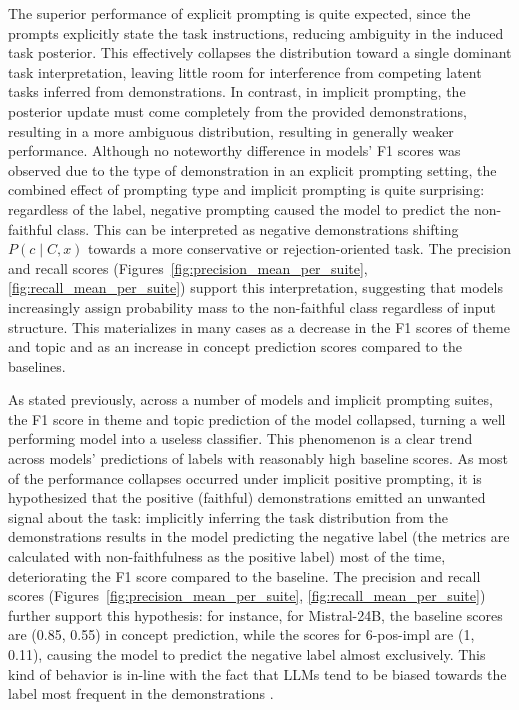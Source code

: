\documentclass[english, 12pt, a4paper, sci, utf8, a-2b, online]{latex/definitions/aaltothesis}
\begin{document}
The superior performance of explicit prompting is quite expected, since the prompts explicitly state the task instructions, reducing ambiguity in the induced task posterior. This effectively collapses the distribution toward a single dominant task interpretation, leaving little room for interference from competing latent tasks inferred from demonstrations. In contrast, in implicit prompting, the posterior update must come completely from the provided demonstrations, resulting in a more ambiguous distribution, resulting in generally weaker performance. Although no noteworthy difference in models' F1 scores was observed due to the type of demonstration in an explicit prompting setting, the combined effect of prompting type and implicit prompting is quite surprising: regardless of the label, negative prompting caused the model to predict the non-faithful class. This can be interpreted as negative demonstrations shifting $P(c \mid C, x)$ towards a more conservative or rejection-oriented task. The precision and recall scores (Figures~\ref{fig:precision_mean_per_suite}, \ref{fig:recall_mean_per_suite}) support this interpretation, suggesting that models increasingly assign probability mass to the non-faithful class regardless of input structure. This materializes in many cases as a decrease in the F1 scores of theme and topic and as an increase in concept prediction scores compared to the baselines.

As stated previously, across a number of models and implicit prompting suites, the F1 score in theme and topic prediction of the model collapsed, turning a well performing model into a useless classifier. This phenomenon is a clear trend across models' predictions of labels with reasonably high baseline scores. As most of the performance collapses occurred under implicit positive prompting, it is hypothesized that the positive (faithful) demonstrations emitted an unwanted signal about the task: implicitly inferring the task distribution from the demonstrations results in the model predicting the negative label (the metrics are calculated with non-faithfulness as the positive label) most of the time, deteriorating the F1 score compared to the baseline. The precision and recall scores (Figures~\ref{fig:precision_mean_per_suite}, \ref{fig:recall_mean_per_suite}) further support this hypothesis: for instance, for Mistral-24B, the baseline scores are (0.85, 0.55) in concept prediction, while the scores for 6-pos-impl are (1, 0.11), causing the model to predict the negative label almost exclusively. This kind of behavior is in-line with the fact that LLMs tend to be biased towards the label most frequent in the demonstrations \cite{zhao2021calibrateuseimprovingfewshot, gupta2023robustllmsincontextmajority}.
\end{document}
